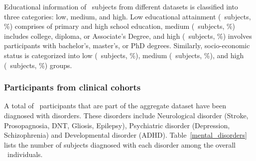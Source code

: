 Educational information of \TotalSubjectsWithEducationCount\ subjects from different datasets is classified into three categories: low, medium, and high. 
Low educational attainment (\TotalSubjectsWithLowEducationCount\ subjects, \TotalSubjectsWithLowEducationPercentage\%) comprises of primary and high school education, 
medium (\TotalSubjectsWithMediumEducationCount\ subjects, \TotalSubjectsWithMediumEducationPercentage\%) includes college, diploma, or Associate's Degree, 
and high (\TotalSubjectsWithHighEducationCount\ subjects, \TotalSubjectsWithHighEducationPercentage\%) involves participants with bachelor's, master's, or PhD degrees. 
Similarly, socio-economic status is categorized into low (\TotalSubjectsWithLowEconomicCount\ subjects, \TotalSubjectsWithLowEconomicPercentage\%), 
medium (\TotalSubjectsWithMediumEconomicCount\ subjects, \TotalSubjectsWithMediumEconomicPercentage\%), and high (\TotalSubjectsWithHighEconomicCount\ subjects, 
\TotalSubjectsWithHighEconomicPercentage\%) groups.




\subsubsection{Participants from clinical cohorts}

A total of \TotalSubjectsWithDisordersCount\ participants that are part of the aggregate dataset have been diagnosed with disorders.
These disorders include Neurological disorder (Stroke, Prosopagnosia, DNT, Gliosis, Epilepsy), Psychiatric disorder (Depression, Schizophrenia)
and Developmental disorder (ADHD). 
Table~\ref{mental_disorders} lists the number of subjects diagnosed with each disorder among 
the overall \TotalSubjectsIncludedAfterInspectionCount\ individuals. 


